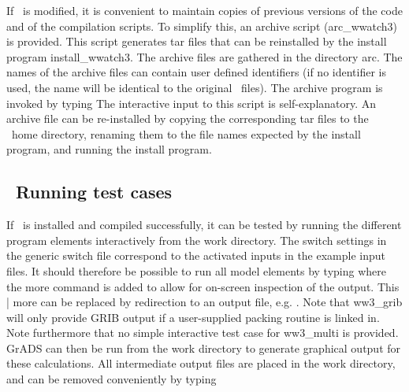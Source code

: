 If \ws\ is modified, it is convenient to maintain copies of previous versions
of the code and of the compilation scripts. To simplify this, an archive
script ({\file arc\_wwatch3}) is provided. This script generates {\file tar}
files that can be reinstalled by the install program {\file
install\_wwatch3}. The archive files are gathered in the directory {\dir
arc}. The names of the archive files can contain user defined identifiers (if
no identifier is used, the name will be identical to the original \ws\
files). The archive program is invoked by typing 
\noindent
The interactive input to this script is self-explanatory. An archive file can
be re-installed by copying the corresponding {\file tar} files to the \ws\
home directory, renaming them to the file names expected by the install
program, and running the install program.


\vssub
\subsection{~Running test cases} \label{sec:tests}
\vssub

If \ws\ is installed and compiled successfully, it can be tested by running
the different program elements interactively from the {\file work}
directory. The switch settings in the generic switch file correspond to the
activated inputs in the example input files. It should therefore be possible
to run all model elements by typing
where the {\code more} command is added to allow for on-screen inspection of
the output. This {\code | more} can be replaced by redirection to an output 
file, e.g. \command{ww3\_grid > ww3\_grid.out }. Note that {\code ww3\_grib} will only provide GRIB output if a
user-supplied packing routine is linked in. Note furthermore that no simple
interactive test case for {\file ww3\_multi} is provided. GrADS can then be
run from the work directory to generate graphical output for these
calculations. All intermediate output files are placed in the {\file work}
directory, and can be removed conveniently by typing 

